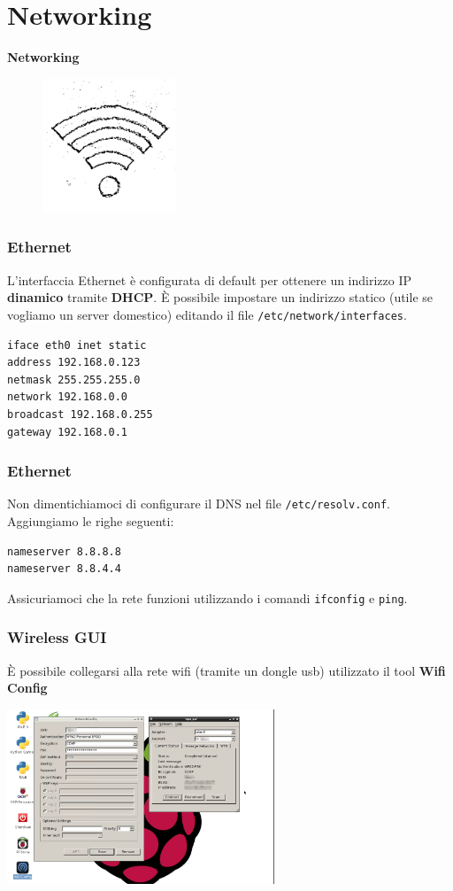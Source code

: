 \documentclass[xcolor=svgnames,11pt]{beamer}
\begin{document}
\section{Networking}
\begin{frame}{}
\begin{center}
\begin{Huge}
{\color{green_raspi} \textbf{Networking}}
\end{Huge}
\begin{figure}
\includegraphics[height=4cm]{meme4.png}
\end{figure}
\end{center}
\end{frame}

\begin{frame}[fragile]\frametitle{Ethernet}
L'interfaccia Ethernet \`e configurata di default per ottenere un indirizzo IP \textbf{dinamico} tramite \textbf{DHCP}.
\medskip
\`E possibile impostare un indirizzo statico (utile se vogliamo un server domestico) editando il file \texttt{/etc/network/interfaces}.
\begin{verbatim}
iface eth0 inet static
address 192.168.0.123
netmask 255.255.255.0
network 192.168.0.0
broadcast 192.168.0.255
gateway 192.168.0.1
\end{verbatim}
\end{frame}

\begin{frame}[fragile]\frametitle{Ethernet}
Non dimentichiamoci di configurare il DNS nel file \texttt{/etc/resolv.conf}. Aggiungiamo le righe seguenti:
\begin{verbatim}
nameserver 8.8.8.8
nameserver 8.8.4.4
\end{verbatim}

\medskip
Assicuriamoci che la rete funzioni utilizzando i comandi \texttt{ifconfig} e \texttt{ping}.
\end{frame}

\begin{frame}\frametitle{Wireless GUI}
\`E possibile collegarsi alla rete wifi (tramite un dongle usb) utilizzato il tool \textbf{Wifi Config}
\medskip
\begin{center}
\includegraphics[width=8cm]{wpa-gui.png}
\end{center}
\end{frame}
\end{document}
